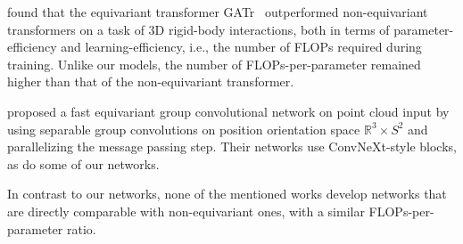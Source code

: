 \citet{brehmer2024does} found that the equivariant transformer GATr~\cite{brehmer2024geometric} outperformed non-equivariant transformers on a task of 3D rigid-body interactions, both in terms of parameter-efficiency and learning-efficiency, i.e., the number of FLOPs required during training.
Unlike our models, the number of FLOPs-per-parameter remained higher than that of the non-equivariant transformer.


\citet{bekkers2024fast} proposed a fast equivariant group convolutional network on point cloud input by using separable group convolutions on position orientation space $\mathbb{R}^3 \times S^2$ and parallelizing the message passing step. 
Their networks use ConvNeXt-style blocks, as do some of our networks.

In contrast to our networks, none of the mentioned works develop networks that are directly comparable with non-equivariant ones, with a similar FLOPs-per-parameter ratio.